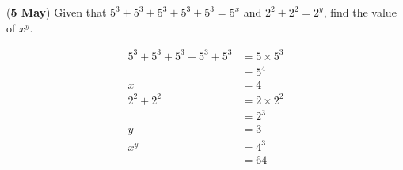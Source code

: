 \documentclass[12pt, answers]{exam}
\begin{document}
\begin{questions}
	\question (\textbf{5 May}) Given that \(5^3 + 5^3 + 5^3 + 5^3 + 5^3 = 5^x\) and
	\(2^2 + 2^2 = 2^y\), find the value of \(x^y\).
	\begin{solution}
		\begin{align*}
			5^3 + 5^3 + 5^3 + 5^3 + 5^3 & = 5 \times 5^3               \\
			                            & = 5^4                        \\
			x                           & = 4 \label{eq:05051} \tag{1} \\
			2^2 + 2^2                   & = 2 \times 2^2               \\
			                            & = 2^3                        \\
			y                           & = 3 \label{eq:05052} \tag{2} \\
			x^y                         & = 4^3                        \\
			                            & = 64
		\end{align*}
	\end{solution}
\end{questions}
\end{document}
